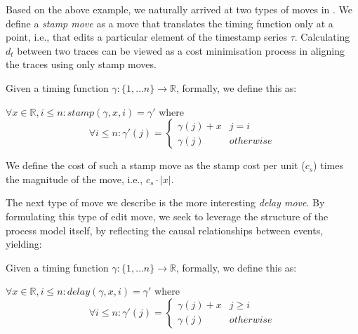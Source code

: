 \documentclass[runningheads]{llncs}
\newcounter{cases}
\begin{document}
    Based on the above example, we naturally arrived at two types of moves in \cite{CR22}.  
    We define a \textit{stamp move} as a move that translates the timing function only at a point, i.e., that edits a particular element of the timestamp series $\tau$. 
    Calculating $d_t$ between two traces can be viewed as a cost minimisation process in aligning the traces using only stamp moves. 
    
    \begin{definition}
        Given a timing function $\gamma: \{1, \dots n\} \to \mathbb{R}$, formally, we define this as: 
        
        $\forall x \in \mathbb{R}, i \leq n: stamp(\gamma, x, i) =\gamma' $ where
        $$\forall i \leq n: \gamma'(j)  = \begin{cases}
            \gamma(j) + x & j = i \\
            \gamma(j)& otherwise
        \end{cases}$$
        
    \end{definition}
    We define the cost of such a stamp move as the stamp cost per unit ($c_s$) times the magnitude of the move, i.e., $c_s \cdot |x|$. 

    The next type of move we describe is the more interesting \textit{delay move}. 
    By formulating this type of edit move, we seek to leverage the structure of the process model itself, by reflecting the causal relationships between events, yielding:

    
    \begin{definition}
        Given a timing function $\gamma: \{1, \dots n\} \to \mathbb{R}$, formally, we define this as: 
        
        $\forall x \in \mathbb{R}, i \leq n: delay(\gamma, x, i) =\gamma' $ where
        $$\forall i \leq n: \gamma'(j)  = \begin{cases}
            \gamma(j) + x & j \geq  i \\
            \gamma(j)& otherwise
        \end{cases}$$
        
    \end{definition}
    
\end{document}
